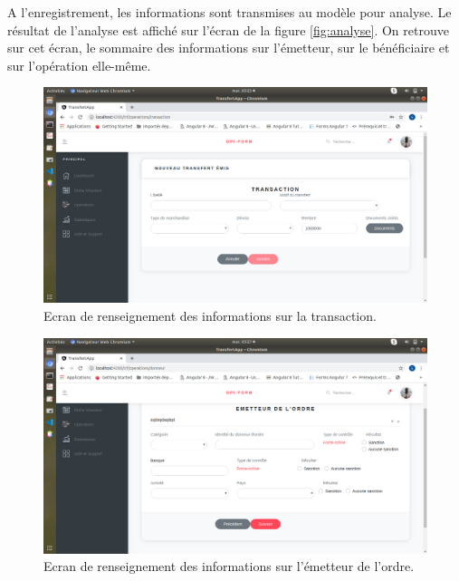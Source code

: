 A l'enregistrement, les informations sont transmises au modèle pour analyse. Le résultat
de l'analyse est affiché sur l'écran de la figure \ref{fig:analyse}. On retrouve
sur cet écran, le sommaire des informations sur l'émetteur, sur le bénéficiaire
et sur l'opération elle-même.


\begin{figure}[h!]
  \begin{center}
    \includegraphics[width=14cm]{images/transaction.png}
    \caption{Ecran de renseignement des informations sur la transaction.\label{fig:transaction}}
  \end{center}
\end{figure}


\begin{figure}[h!]
  \begin{center}
    \includegraphics[width=14cm]{images/emetteur.png}
    \caption{Ecran de renseignement des informations sur l'émetteur de l'ordre.\label{fig:emetteur}}
  \end{center}
\end{figure}

